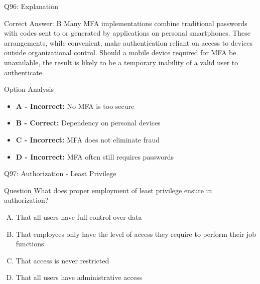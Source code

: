 \documentclass{beamer}
\begin{document}
	\begin{frame}{Q96: Explanation}
		\begin{block}{Correct Answer: B}
			Many MFA implementations combine traditional passwords with codes sent to or generated by applications on personal smartphones. These arrangements, while convenient, make authentication reliant on access to devices outside organizational control. Should a mobile device required for MFA be unavailable, the result is likely to be a temporary inability of a valid user to authenticate.
		\end{block}
		\begin{block}{Option Analysis}
			\begin{itemize}
				\item \textbf{A - Incorrect:} No MFA is too secure
				\item \textbf{B - Correct:} Dependency on personal devices
				\item \textbf{C - Incorrect:} MFA does not eliminate fraud
				\item \textbf{D - Incorrect:} MFA often still requires passwords
			\end{itemize}
		\end{block}
	\end{frame}
	
	\begin{frame}{Q97: Authorization - Least Privilege}
		\begin{block}{Question}
			What does proper employment of least privilege ensure in authorization?
		\end{block}
		\begin{enumerate}[(A)]
			\item That all users have full control over data
			\item That employees only have the level of access they require to perform their job functions
			\item That access is never restricted
			\item That all users have administrative access
		\end{enumerate}
	\end{frame}
	
\end{document}
